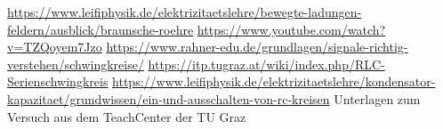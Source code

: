 \documentclass{article}
\begin{document}


%


%


\begin{thebibliography}{9}
 \url{https://www.leifiphysik.de/elektrizitaetslehre/bewegte-ladungen-feldern/ausblick/braunsche-roehre}
 \url{https://www.youtube.com/watch?v=TZQoyem7Jzo}
 \url{https://www.rahner-edu.de/grundlagen/signale-richtig-verstehen/schwingkreise/}
 \url{https://itp.tugraz.at/wiki/index.php/RLC-Serienschwingkreis}
 \url{https://www.leifiphysik.de/elektrizitaetslehre/kondensator-kapazitaet/grundwissen/ein-und-ausschalten-von-rc-kreisen}
 Unterlagen zum Versuch aus dem TeachCenter der TU Graz

\end{thebibliography}
\end{document}
